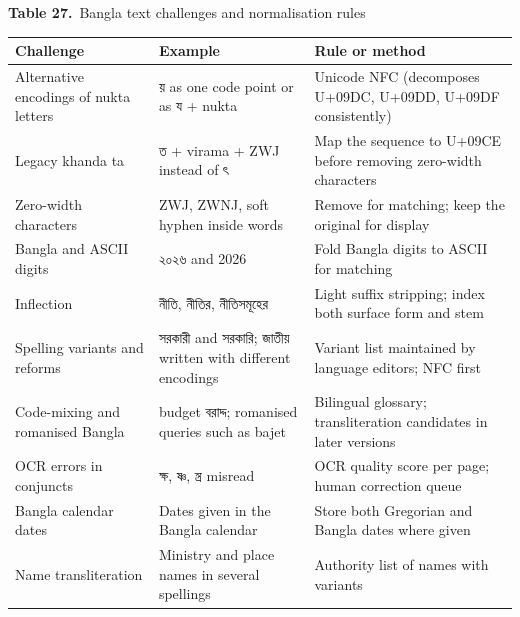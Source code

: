 \documentclass[border=10pt]{standalone}
\begin{document}
\begin{minipage}{17cm}
{\large\bfseries Table 27.}\ {\large Bangla text challenges and normalisation rules}\par\vspace{7pt}
\small
{}
\begin{tabularx}{\linewidth}{@{}>{\hsize=0.750\hsize\raggedright\arraybackslash}X>{\hsize=0.947\hsize\raggedright\arraybackslash}X>{\hsize=1.303\hsize\raggedright\arraybackslash}X@{}}
\arrayrulecolor{bapilrule}\toprule
\rowcolor{white}\textbf{Challenge} & \textbf{Example} & \textbf{Rule or method} \\
\midrule
Alternative encodings of nukta letters & য় as one code point or as য + nukta & Unicode NFC (decomposes U+09DC, U+09DD, U+09DF consistently) \\
Legacy khanda ta & ত + virama + ZWJ instead of ৎ & Map the sequence to U+09CE before removing zero-width characters \\
Zero-width characters & ZWJ, ZWNJ, soft hyphen inside words & Remove for matching; keep the original for display \\
Bangla and ASCII digits & ২০২৬ and 2026 & Fold Bangla digits to ASCII for matching \\
Inflection & নীতি, নীতির, নীতিসমূহের & Light suffix stripping; index both surface form and stem \\
Spelling variants and reforms & সরকারী and সরকারি; জাতীয় written with different encodings & Variant list maintained by language editors; NFC first \\
Code-mixing and romanised Bangla & budget বরাদ্দ; romanised queries such as bajet & Bilingual glossary; transliteration candidates in later versions \\
OCR errors in conjuncts & ক্ষ, ষ্ণ, ন্ত্র misread & OCR quality score per page; human correction queue \\
Bangla calendar dates & Dates given in the Bangla calendar & Store both Gregorian and Bangla dates where given \\
Name transliteration & Ministry and place names in several spellings & Authority list of names with variants \\
\bottomrule
\end{tabularx}
\par{}
\end{minipage}
\end{document}

